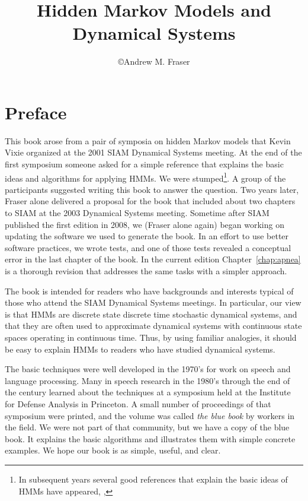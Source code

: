 \documentclass[ltxbook, commentsvisible]{hmmdsbook}
\author{\copyright Andrew M. Fraser}
\title{Hidden Markov Models and Dynamical Systems}
\begin{document}
\frontmatter
\maketitle

\chapter*{Preface}
\label{chap:preface}

This book arose from a pair of symposia on hidden Markov models that
Kevin Vixie organized at the 2001 SIAM Dynamical Systems meeting.  At
the end of the first symposium someone asked for a simple reference
that explains the basic ideas and algorithms for applying HMMs.  We
were stumped\footnote{In subsequent years several good references that
  explain the basic ideas of HMMs have appeared, \eg, }.  A group of the participants suggested writing this book
to answer the question.  Two years later, Fraser alone delivered a
proposal for the book that included about two chapters to SIAM at the
2003 Dynamical Systems meeting.  Sometime after SIAM published the
first edition in 2008, we (Fraser alone again) began working on
updating the software we used to generate the book.  In an effort to
use better software practices, we wrote tests, and one of those tests
revealed a conceptual error in the last chapter of the book.  In the
current edition Chapter~\ref{chap:apnea} is a thorough revision that
addresses the same tasks with a simpler approach.

The book is intended for readers who have backgrounds and interests
typical of those who attend the SIAM Dynamical Systems meetings.  In
particular, our view is that HMMs are discrete state discrete time
stochastic dynamical systems, and that they are often used to
approximate dynamical systems with continuous state spaces operating
in continuous time.  Thus, by using familiar analogies, it should be
easy to explain HMMs to readers who have studied dynamical systems.

The basic techniques were well developed in the 1970's for work on
speech and language processing.  Many in speech research in the 1980's
through the end of the century learned about the techniques at a
symposium held at the Institute for Defense Analysis  in Princeton.  A small number of proceedings
of that symposium \cite{ida80} were printed, and the volume was called
\emph{the blue book} by workers in the field.  We were not part of
that community, but we have a copy of the blue book.  It explains the
basic algorithms and illustrates them with simple concrete examples.
We hope our book is as simple, useful, and clear.
\end{document}
